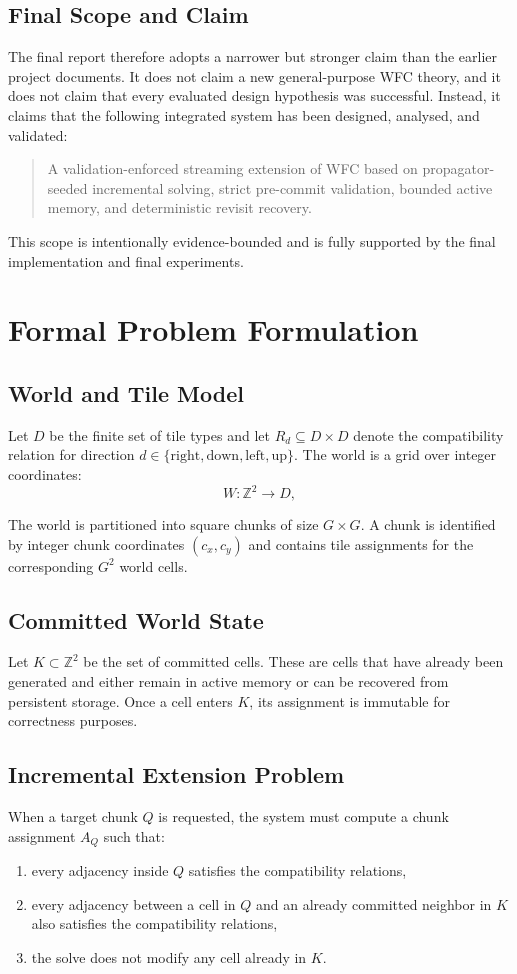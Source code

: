 \documentclass[12pt,a4paper]{report}
\begin{document}
\section{Final Scope and Claim}
The final report therefore adopts a narrower but stronger claim than the earlier project documents. It does not claim a new general-purpose WFC theory, and it does not claim that every evaluated design hypothesis was successful. Instead, it claims that the following integrated system has been designed, analysed, and validated:
\begin{quote}
A validation-enforced streaming extension of WFC based on propagator-seeded incremental solving, strict pre-commit validation, bounded active memory, and deterministic revisit recovery.
\end{quote}

This scope is intentionally evidence-bounded and is fully supported by the final implementation and final experiments.

\chapter{Formal Problem Formulation}
\section{World and Tile Model}
Let $D$ be the finite set of tile types and let $R_d \subseteq D \times D$ denote the compatibility relation for direction $d \in \{\text{right}, \text{down}, \text{left}, \text{up}\}$. The world is a grid over integer coordinates:
\[
W : \mathbb{Z}^2 \to D,
\]

The world is partitioned into square chunks of size $G \times G$. A chunk is identified by integer chunk coordinates $(c_x, c_y)$ and contains tile assignments for the corresponding $G^2$ world cells.

\section{Committed World State}
Let $K \subset \mathbb{Z}^2$ be the set of committed cells. These are cells that have already been generated and either remain in active memory or can be recovered from persistent storage. Once a cell enters $K$, its assignment is immutable for correctness purposes.

\section{Incremental Extension Problem}
When a target chunk $Q$ is requested, the system must compute a chunk assignment $A_Q$ such that:
\begin{enumerate}
\item every adjacency inside $Q$ satisfies the compatibility relations,
\item every adjacency between a cell in $Q$ and an already committed neighbor in $K$ also satisfies the compatibility relations,
\item the solve does not modify any cell already in $K$.
\end{enumerate}
\end{document}
